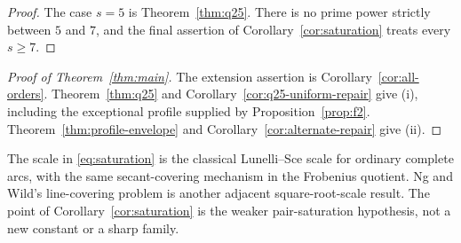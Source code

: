 \begin{proof}
The case $s=5$ is Theorem~\ref{thm:q25}.  There is no prime power strictly
between $5$ and $7$, and the final assertion of
Corollary~\ref{cor:saturation} treats every $s\ge7$.
\end{proof}

\begin{proof}[Proof of Theorem~\ref{thm:main}]
The extension assertion is Corollary~\ref{cor:all-orders}.
Theorem~\ref{thm:q25} and Corollary~\ref{cor:q25-uniform-repair} give (i),
including the exceptional profile supplied by Proposition~\ref{prop:f2}.
Theorem~\ref{thm:profile-envelope} and
Corollary~\ref{cor:alternate-repair} give (ii).
\end{proof}

The scale in \eqref{eq:saturation} is the classical Lunelli--Sce scale for
ordinary complete arcs, with the same secant-covering mechanism in the
Frobenius quotient.  Ng and Wild's line-covering problem
\cite{NgWild2001} is another adjacent square-root-scale result.  The point
of Corollary~\ref{cor:saturation} is the weaker pair-saturation hypothesis,
not a new constant or a sharp family.
